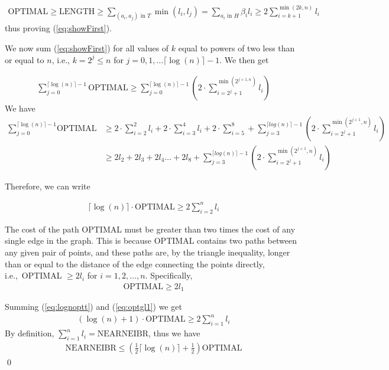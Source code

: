 \begin{align*}
\text{OPTIMAL} \geq \text{LENGTH} \geq \sum_{(a_i,a_j) \text{ in } T} \min(l_i,l_j) = \sum_{a_i \text{ in } H} \beta_i l_i \geq 2 \sum_{i=k+1}^{\min(2k,n)} l_i
\end{align*}
thus proving (\ref{eq:showFirst}). 

We now sum (\ref{eq:showFirst}) for all values of $k$ equal to powers of two less than or equal to $n$, i.e., $k = 2^{j} \leq n$ for $j = 0, 1, \dots \lceil \log(n) \rceil - 1$. We then get

\begin{align*}
\sum_{j=0}^{\lceil \log(n) \rceil -1} \text{OPTIMAL} \geq \sum_{j=0}^{\lceil \log(n) \rceil - 1} ( 2 \cdot \sum_{i=2^j + 1}^{\min(2^{j+1,n})} l_i )
\end{align*}
We have
\begin{align*}
\sum_{j=0}^{\lceil \log(n) \rceil -1} \text{OPTIMAL} &\geq 2 \cdot \sum_{i=2}^2 l_i + 2 \cdot \sum_{i=3}^4 l_i + 2 \cdot \sum_{i=5}^8 + \sum_{j=3}^{\lceil log(n) \rceil - 1} (2 \cdot \sum_{i = 2^j+1}^{\min(2^{j+1},n)} l_i )\\
& \geq 2 l_2 + 2 l_3 + 2 l_4 \dots +2l_8 + \sum_{j=3}^{\lceil log(n) \rceil - 1} (2 \cdot \sum_{i = 2^j+1}^{\min(2^{j+1},n)} l_i)
\end{align*}

Therefore, we can write

\begin{align}
\lceil \log(n) \rceil \cdot \text{OPTIMAL} \geq 2 \sum_{i = 2}^n l_i \label{eq:lognoptt}
\end{align}

The cost of the path OPTIMAL must be greater than two times the cost of any single edge in the graph. This is because OPTIMAL contains two paths between any given pair of points, and these paths are, by the triangle inequality, longer than or equal to the distance of the edge connecting the points directly, i.e.,\ OPTIMAL $\geq 2 l_i$ for $i = 1,2,\dots, n$. Specifically,
\begin{align}
\text{OPTIMAL} \geq 2 l_1 \label{eq:optgl1}
\end{align}

Summing (\ref{eq:lognoptt}) and (\ref{eq:optgl1}) we get 
\begin{align*}
(\log(n)+1) \cdot \text{OPTIMAL} \geq 2 \sum_{i=1}^n l_i
\end{align*}
By definition, $\sum_{i=1}^n l_i = \text{NEARNEIBR}$, thus we have 
\begin{align*}
\text{NEARNEIBR} \leq (\frac{1}{2} \lceil \log(n) \rceil + \frac{1}{2}) \text{OPTIMAL}
\end{align*}
\qed 

